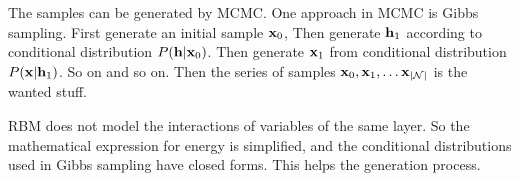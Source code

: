 The samples can be generated by MCMC.
One approach in MCMC is Gibbs sampling.
First generate an initial sample ${\mathbf{x}}_0$,
Then generate ${\mathbf{h}}_1$ according to conditional distribution $P({\mathbf{h}}|{\mathbf{x}}_0)$.
Then generate ${\mathbf{x}}_1$ from conditional distribution $P({\mathbf{x}}|{\mathbf{h}}_1)$.
So on and so on.
Then the series of samples ${\mathbf{x}}_0, {\mathbf{x}}_1,\dots{\mathbf{x}}_{|{\mathcal{N}}|}$ is the wanted stuff.

RBM does not model the interactions of variables of the same layer.
So the mathematical expression for energy is simplified,
and the conditional distributions used in Gibbs sampling have closed forms.
This helps the generation process.
